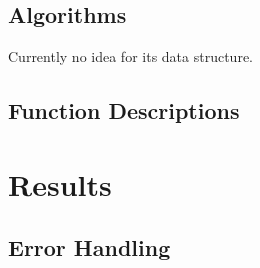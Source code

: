 \documentclass{article}
\begin{document}
\subsection{Algorithms}

Currently no idea for its data structure.


\subsection{Function Descriptions}


\section{Results}


\subsection{Error Handling}




%
\end{document}
